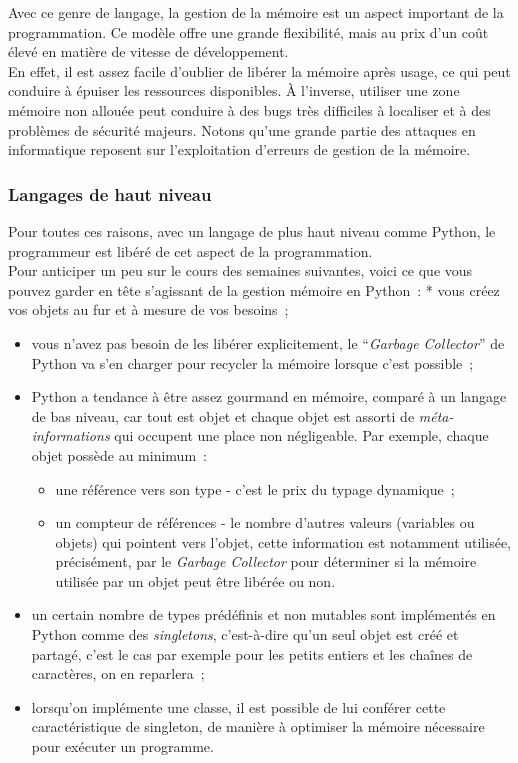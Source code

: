     Avec ce genre de langage, la gestion de la mémoire est un aspect
important de la programmation. Ce modèle offre une grande flexibilité,
mais au prix d'un coût élevé en matière de vitesse de développement.\\

En effet, il est assez facile d'oublier de libérer la mémoire après
usage, ce qui peut conduire à épuiser les ressources disponibles. À
l'inverse, utiliser une zone mémoire non allouée peut conduire à des
bugs très difficiles à localiser et à des problèmes de sécurité majeurs.
Notons qu'une grande partie des attaques en informatique reposent sur
l'exploitation d'erreurs de gestion de la mémoire.

    \hypertarget{langages-de-haut-niveau}{%
\subsubsection{Langages de haut niveau}\label{langages-de-haut-niveau}}

    Pour toutes ces raisons, avec un langage de plus haut niveau comme
Python, le programmeur est libéré de cet aspect de la programmation.\\

Pour anticiper un peu sur le cours des semaines suivantes, voici ce que
vous pouvez garder en tête s'agissant de la gestion mémoire en Python~:
* vous créez vos objets au fur et à mesure de vos besoins~;

\begin{itemize}
\item
  vous n'avez pas besoin de les libérer explicitement, le
  ``\emph{Garbage Collector}'' de Python va s'en charger pour recycler
  la mémoire lorsque c'est possible~;
\item
  Python a tendance à être assez gourmand en mémoire, comparé à un
  langage de bas niveau, car tout est objet et chaque objet est assorti
  de \emph{méta-informations} qui occupent une place non négligeable.
  Par exemple, chaque objet possède au minimum~:

  \begin{itemize}
  \tightlist
  \item
    une référence vers son type - c'est le prix du typage dynamique~;
  \item
    un compteur de références - le nombre d'autres valeurs (variables ou
    objets) qui pointent vers l'objet, cette information est notamment
    utilisée, précisément, par le \emph{Garbage Collector} pour
    déterminer si la mémoire utilisée par un objet peut être libérée ou
    non.
  \end{itemize}
\item
  un certain nombre de types prédéfinis et non mutables sont implémentés
  en Python comme des \emph{singletons}, c'est-à-dire qu'un seul objet
  est créé et partagé, c'est le cas par exemple pour les petits entiers
  et les chaînes de caractères, on en reparlera~;
\item
  lorsqu'on implémente une classe, il est possible de lui conférer cette
  caractéristique de singleton, de manière à optimiser la mémoire
  nécessaire pour exécuter un programme.
\end{itemize}